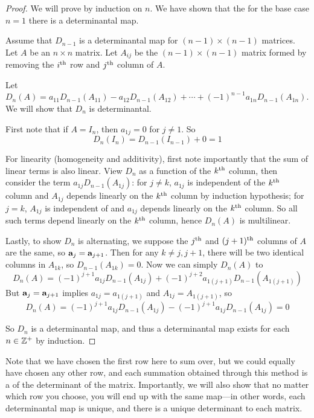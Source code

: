\documentclass{styles/tufte}
\begin{document}
  \begin{proof}
    We will prove by induction on $n$. We have shown that the for the base case $n = 1$ there is a determinantal map.
    
    Assume that $D_{n-1}$ is a determinantal map for $(n - 1) \times (n - 1)$ matrices. Let $A$ be an $n \times n$ matrix. Let $A_{ij}$ be the $(n - 1) \times (n - 1)$ matrix formed by removing the $i\textsuperscript{th}$ row and $j\textsuperscript{th}$ column of $A$.
    
    Let $D_n(A) = a_{11} D_{n-1}(A_{11}) - a_{12} D_{n-1}(A_{12}) + \cdots + (-1)^{n-1} a_{1n} D_{n-1}(A_{1n})$. We will show that $D_n$ is determinantal.
    
    First note that if $A = I_n$, then $a_{1j} = 0$ for $j \neq 1$. So
    \[ D_n(I_n) = D_{n-1}(I_{n-1}) + 0 = 1 \]
    
    For linearity (homogeneity and additivity), first note importantly that the sum of linear terms is also linear. View $D_n$ as a function of the $k\textsuperscript{th}$ column, then consider the term $a_{1j} D_{n-1}(A_{1j})$: for $j \neq k$, $a_{1j}$ is independent of the $k\textsuperscript{th}$ column and $A_{1j}$ depends linearly on the $k\textsuperscript{th}$ column by induction hypothesis; for $j = k$, $A_{1j}$ is independent of and $a_{1j}$ depends linearly on the $k\textsuperscript{th}$ column. So all such terms depend linearly on the $k\textsuperscript{th}$ column, hence $D_n(A)$ is multilinear. 
    
    Lastly, to show $D_n$ is alternating, we suppose the $j\textsuperscript{th}$ and $(j + 1)\textsuperscript{th}$ columns of $A$ are the same, so $\vb{a}_j = \vb{a}_{j+1}$. Then for any $k \neq j, j + 1$, there will be two identical columns in $A_{1k}$, so $D_{n-1}(A_{1k}) = 0$. Now we can simply $D_n(A)$ to
    \[ D_n(A) = (-1)^{j+1} a_{1j} D_{n-1}(A_{1j}) + (-1)^{j+2} a_{1(j+1)} D_{n-1}\left(A_{1(j+1)}\right) \]
    But $\vb{a}_j = \vb{a}_{j+1}$ implies $a_{1j} = a_{1(j+1)}$ and $A_{1j} = A_{1(j+1)}$, so
    \[ D_n(A) = (-1)^{j+1} a_{1j} D_{n-1}(A_{1j}) - (-1)^{j+1} a_{1j} D_{n-1}(A_{1j}) = 0 \]
    
    So $D_n$ is a determinantal map, and thus a determinantal map exists for each $n \in \mathbb{Z}^+$ by induction.
  \end{proof}
  
  
  Note that we have chosen the first row here to sum over, but we could equally have chosen any other row, and each summation obtained through this method is a  of the determinant of the matrix. Importantly, we will also show that no matter which row you choose, you will end up with the same map---in other words, each determinantal map is unique, and there is a unique determinant to each matrix.
  
\end{document}
